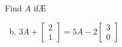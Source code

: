 \documentclass[../main.tex]{subfiles}
\begin{document}
Find $A$ ifÆ
\begin{enumerate}[a)]
	\setcounter{enumi}{1}
	\item
		$
			3A
			+
			\left[\begin{array}{r}
				2 \\
				1
			\end{array}\right]
			=
			5A
			-
			2
			\left[\begin{array}{r}
				3 \\
				0
			\end{array}\right]
		$
\end{enumerate}
\end{document}
